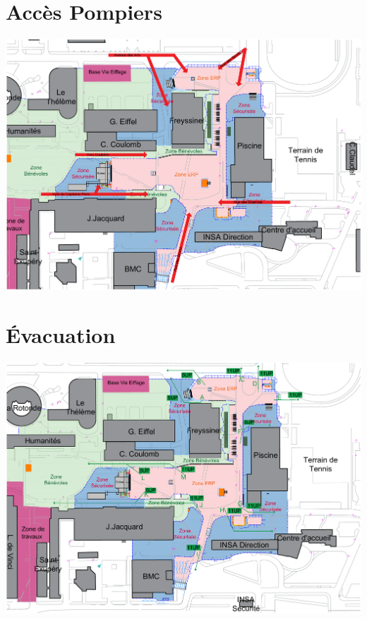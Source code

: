 \documentclass[hidelinks, paper=a4, fontsize=13pt]{report}
\begin{document}
\section{Accès Pompiers}
	\begin{center}\includegraphics[width=.95\textheight,angle=90]{Exports/Plan_24h_45eme-Acces_Pompiers}\end{center}


\section{Évacuation}
	\begin{center}\includegraphics[width=.95\textheight,angle=90]{Exports/Plan_24h_45eme-IS}\end{center}
\end{document}
